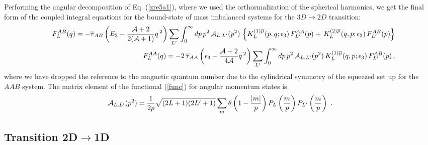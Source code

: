 \documentclass[twocolumn,showpacs,aps,prl,10pt]{revtex4}
\begin{document}
Performing the angular decomposition of Eq. (\ref{zre5a1}), where we used  the orthormalization 
of the spherical harmonics, we get the final form of the coupled integral equations for the bound-state 
of mass imbalanced systems for the $3D\to2D$ transition:
\begin{eqnarray}   
\nonumber
&&F_L^{AB}( q) =-\overline\tau_{AB}\left(E_3-\frac{{\cal A}+2}{2({\cal A}+1)} { q}\,^2\right) 
\sum_{L'}\int_0^\infty dp \, p^2 \, {\cal A}_{L,L'}(p^2)\, \left\{ K^{(1)\overline\mu}_{L}( p,q;\epsilon_3)
\, F^{AA}_{L'}(p) 
+  \, K^{(2)\overline\mu}_{L}( q,p;\epsilon_3)
\, F^{AB}_{L'}(p)\right\}
\\ 
&&F^{AA}_{L}(q) =-2\,\overline \tau_{AA}\left(\epsilon_3-\frac{{\cal A}+2}{4{\cal A}} {q}\,^2\right) 
 \sum_{L'}\int_0^\infty dp \, p^2 \, {\cal A}_{L,L'}(p^2)\, K^{(1)\overline\mu}_{L}( q,p;\epsilon_3)
\, F^{AB}_{L'}(p)    \, ,
\end{eqnarray}
where we have dropped the reference to the magnetic quantum number due to the cylindrical symmetry of the 
squeezed set up for the $AAB$ system. The matrix element of the functional (\ref{func}) for angular momentum states is
\begin{equation}
{\cal A}_{L,L'}(p^2)=\frac{1}{2p}\sqrt{(2L+1)(2L'+1)} \sum_m\theta\left(1-\frac{|m|}{p}\right) P_L\left(\frac{m}{p}\right) P_{L'}\left(\frac{m}{p}\right) \  .
\end{equation}


\subsection{Transition 2D$\rightarrow$1D}
\end{document}
